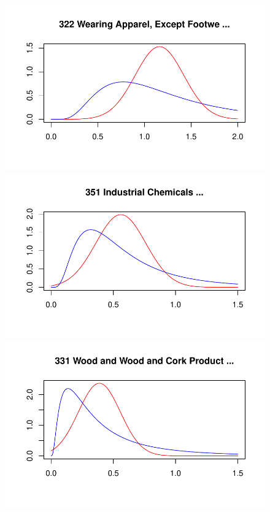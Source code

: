 \documentclass[
  12pt]{article}
\theoremstyle{definition}
\theoremstyle{remark}
\begin{document}
\begin{figure}

\begin{minipage}{\linewidth}

\includegraphics{Tax-Prod_files/figure-pdf/unnamed-chunk-36-1.pdf}

\includegraphics{Tax-Prod_files/figure-pdf/unnamed-chunk-36-2.pdf}

\includegraphics{Tax-Prod_files/figure-pdf/unnamed-chunk-36-3.pdf}


\end{minipage}
\end{figure}
\end{document}
